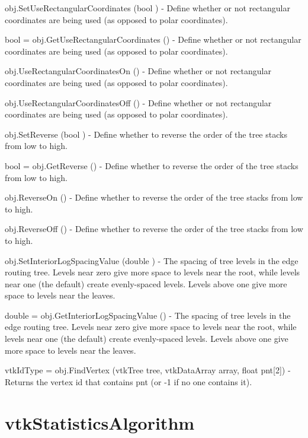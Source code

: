 \begin{DoxyItemize}
\item {\ttfamily obj.\-Set\-Use\-Rectangular\-Coordinates (bool )} -\/ Define whether or not rectangular coordinates are being used (as opposed to polar coordinates).  
\item {\ttfamily bool = obj.\-Get\-Use\-Rectangular\-Coordinates ()} -\/ Define whether or not rectangular coordinates are being used (as opposed to polar coordinates).  
\item {\ttfamily obj.\-Use\-Rectangular\-Coordinates\-On ()} -\/ Define whether or not rectangular coordinates are being used (as opposed to polar coordinates).  
\item {\ttfamily obj.\-Use\-Rectangular\-Coordinates\-Off ()} -\/ Define whether or not rectangular coordinates are being used (as opposed to polar coordinates).  
\item {\ttfamily obj.\-Set\-Reverse (bool )} -\/ Define whether to reverse the order of the tree stacks from low to high.  
\item {\ttfamily bool = obj.\-Get\-Reverse ()} -\/ Define whether to reverse the order of the tree stacks from low to high.  
\item {\ttfamily obj.\-Reverse\-On ()} -\/ Define whether to reverse the order of the tree stacks from low to high.  
\item {\ttfamily obj.\-Reverse\-Off ()} -\/ Define whether to reverse the order of the tree stacks from low to high.  
\item {\ttfamily obj.\-Set\-Interior\-Log\-Spacing\-Value (double )} -\/ The spacing of tree levels in the edge routing tree. Levels near zero give more space to levels near the root, while levels near one (the default) create evenly-\/spaced levels. Levels above one give more space to levels near the leaves.  
\item {\ttfamily double = obj.\-Get\-Interior\-Log\-Spacing\-Value ()} -\/ The spacing of tree levels in the edge routing tree. Levels near zero give more space to levels near the root, while levels near one (the default) create evenly-\/spaced levels. Levels above one give more space to levels near the leaves.  
\item {\ttfamily vtk\-Id\-Type = obj.\-Find\-Vertex (vtk\-Tree tree, vtk\-Data\-Array array, float pnt\mbox{[}2\mbox{]})} -\/ Returns the vertex id that contains pnt (or -\/1 if no one contains it).  
\end{DoxyItemize}\hypertarget{vtkinfovis_vtkstatisticsalgorithm}{}\section{vtk\-Statistics\-Algorithm}\label{vtkinfovis_vtkstatisticsalgorithm}
